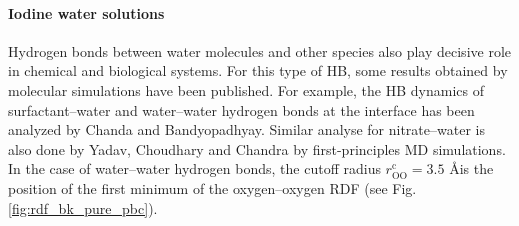 \FloatBarrier

\paragraph{Iodine water solutions}\label{PARAGRAPH_I--W}
Hydrogen bonds between water molecules and other species also play decisive role in chemical and biological systems. 
For this type of HB, some results obtained by molecular simulations have been published. For example,
the HB dynamics of surfactant--water and water--water hydrogen bonds at the interface has been analyzed by Chanda 
and Bandyopadhyay.\cite{Chanda2006} 
Similar analyse for nitrate--water is also done by Yadav, Choudhary and Chandra by first-principles MD simulations.\cite{Yadav2017} 
In the case of water--water hydrogen bonds, the cutoff radius $r_\text{OO}^{\text{c}}=3.5$ \AA is the position of the first minimum of the oxygen--oxygen RDF 
(see Fig.\thinspace\ref{fig:rdf_bk_pure_pbc}).

